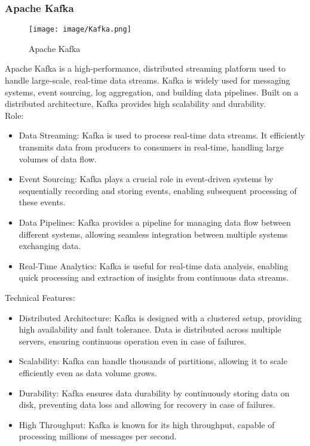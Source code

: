 \documentclass[conference]{IEEEtran}
\begin{document}
\subsubsection{Apache Kafka}

\begin{figure}[h!]
    \centering
    \texttt{[image: image/Kafka.png]}
    \caption{Apache Kafka}
    \label{fig:enter-label}
\end{figure}

\noindent Apache Kafka is a high-performance, distributed streaming platform used to handle large-scale, real-time data streams. Kafka is widely used for messaging systems, event sourcing, log aggregation, and building data pipelines. Built on a distributed architecture, Kafka provides high scalability and durability.\\

Role:
\begin{itemize}
    \item Data Streaming: Kafka is used to process real-time data streams. It efficiently transmits data from producers to consumers in real-time, handling large volumes of data flow.\\
    \item Event Sourcing: Kafka plays a crucial role in event-driven systems by sequentially recording and storing events, enabling subsequent processing of these events.\\
    \item Data Pipelines: Kafka provides a pipeline for managing data flow between different systems, allowing seamless integration between multiple systems exchanging data.\\
    \item Real-Time Analytics: Kafka is useful for real-time data analysis, enabling quick processing and extraction of insights from continuous data streams.\\
\end{itemize}

Technical Features:
\begin{itemize}
    \item Distributed Architecture: Kafka is designed with a clustered setup, providing high availability and fault tolerance. Data is distributed across multiple servers, ensuring continuous operation even in case of failures.\\
    \item Scalability: Kafka can handle thousands of partitions, allowing it to scale efficiently even as data volume grows.\\
    \item Durability: Kafka ensures data durability by continuously storing data on disk, preventing data loss and allowing for recovery in case of failures.\\
    \item High Throughput: Kafka is known for its high throughput, capable of processing millions of messages per second.\\
\end{itemize}
\end{document}

